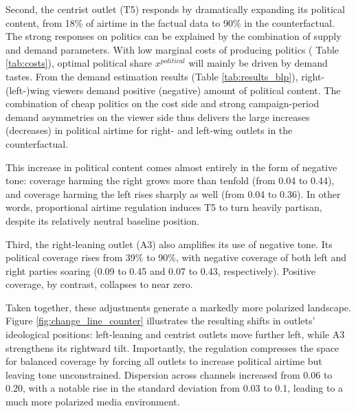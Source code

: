 \documentclass[12pt]{article}
\begin{document}
Second, the centrist outlet (T5) responds by dramatically expanding its political content, from 18\% of airtime in the factual data to 90\% in the counterfactual. The strong responses on politics can be explained by the combination of supply and demand parameters. With low marginal costs of producing politics ( Table \ref{tab:costs}), optimal political share $x^{political}$ will mainly be driven by demand tastes. From the demand estimation results (Table \ref{tab:results_blp}), right-(left-)wing viewers demand positive (negative) amount of political content. The combination of cheap politics on the cost side and strong campaign-period demand asymmetries on the viewer side thus delivers the large increases (decreases) in political airtime for  right- and left-wing outlets in the counterfactual. 



This increase in political content comes almost entirely in the form of negative tone: coverage harming the right grows more than tenfold (from 0.04 to 0.44), and coverage harming the left rises sharply as well (from 0.04 to 0.36). In other words, proportional airtime regulation induces T5 to turn heavily partisan, despite its relatively neutral baseline position.

Third, the right-leaning outlet (A3) also amplifies its use of negative tone. Its political coverage rises from 39\% to 90\%, with negative coverage of both left and right parties soaring (0.09 to 0.45 and 0.07 to 0.43, respectively). Positive coverage, by contrast, collapses to near zero.


Taken together, these adjustments generate a markedly more polarized landscape. Figure \ref{fig:change_line_counter} illustrates the resulting shifts in outlets’ ideological positions: left-leaning and centrist outlets move further left, while A3 strengthens its rightward tilt. Importantly, the regulation compresses the space for balanced coverage by forcing all outlets to increase political airtime but leaving tone unconstrained. Dispersion across channels increased from 0.06 to 0.20, with a notable rise in the standard deviation from 0.03 to 0.1, leading to a much more polarized media environment.
\end{document}
